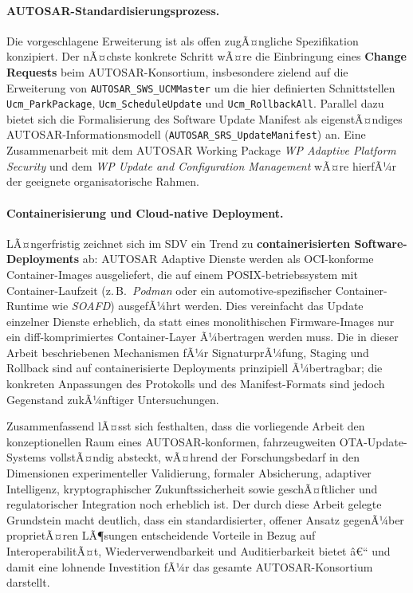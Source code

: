 ﻿\documentclass[12pt,a4paper,twoside]{article}
\begin{document}
\paragraph{AUTOSAR-Standardisierungsprozess.}
Die vorgeschlagene Erweiterung ist als offen zugÃ¤ngliche
Spezifikation konzipiert. Der nÃ¤chste konkrete Schritt wÃ¤re
die Einbringung eines \textbf{Change Requests} beim
AUTOSAR-Konsortium, insbesondere zielend auf
die Erweiterung von \texttt{AUTOSAR\_SWS\_UCMMaster} um die hier
definierten Schnittstellen \texttt{Ucm\_ParkPackage},
\texttt{Ucm\_ScheduleUpdate} und \texttt{Ucm\_RollbackAll}.
Parallel dazu bietet sich die Formalisierung des
Software Update Manifest als eigenstÃ¤ndiges
AUTOSAR-Informationsmodell (\texttt{AUTOSAR\_SRS\_UpdateManifest})
an. Eine Zusammenarbeit mit dem AUTOSAR Working Package
\textit{WP Adaptive Platform Security} und dem
\textit{WP Update and Configuration Management} wÃ¤re hierfÃ¼r
der geeignete organisatorische Rahmen.

\paragraph{Containerisierung und Cloud-native Deployment.}
LÃ¤ngerfristig zeichnet sich im SDV ein Trend zu
\textbf{containerisierten Software-Deployments} ab: AUTOSAR Adaptive
Dienste werden als OCI-konforme Container-Images ausgeliefert,
die auf einem POSIX-betriebssystem mit Container-Laufzeit
(z.\,B.\ \textit{Podman} oder ein automotive-spezifischer
Container-Runtime wie \textit{SOAFD}) ausgefÃ¼hrt werden.
Dies vereinfacht das Update einzelner Dienste erheblich,
da statt eines monolithischen Firmware-Images nur ein
diff-komprimiertes Container-Layer Ã¼bertragen werden muss.
Die in dieser Arbeit beschriebenen Mechanismen fÃ¼r
SignaturprÃ¼fung, Staging und Rollback sind auf containerisierte
Deployments prinzipiell Ã¼bertragbar; die konkreten
Anpassungen des Protokolls und des Manifest-Formats
sind jedoch Gegenstand zukÃ¼nftiger Untersuchungen.

\vspace{0.5em}
Zusammenfassend lÃ¤sst sich festhalten, dass die vorliegende Arbeit
den konzeptionellen Raum eines AUTOSAR-konformen, fahrzeugweiten
OTA-Update-Systems vollstÃ¤ndig absteckt, wÃ¤hrend der
Forschungsbedarf in den Dimensionen experimenteller
Validierung, formaler Absicherung, adaptiver Intelligenz,
kryptographischer Zukunftssicherheit sowie
geschÃ¤ftlicher und regulatorischer Integration
noch erheblich ist. Der durch diese Arbeit gelegte Grundstein
macht deutlich, dass ein standardisierter, offener Ansatz
gegenÃ¼ber proprietÃ¤ren LÃ¶sungen entscheidende Vorteile
in Bezug auf InteroperabilitÃ¤t, Wiederverwendbarkeit
und Auditierbarkeit bietet â€“ und damit eine
lohnende Investition fÃ¼r das gesamte
AUTOSAR-Konsortium darstellt.
\end{document}
